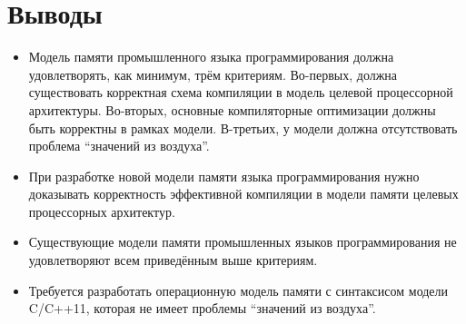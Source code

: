 
\section{Выводы}
\begin{itemize}
  \item Модель памяти промышленного языка программирования должна удовлетворять, как минимум, трём критериям.
    Во-первых, должна существовать корректная схема компиляции в модель целевой процессорной
    архитектуры.
    Во-вторых, основные компиляторные оптимизации должны быть корректны в рамках модели.
    В-третьих, у модели должна отсутствовать проблема ``значений из воздуха''.
  \item При разработке новой модели памяти языка программирования нужно доказывать корректность эффективной компиляции
     в модели памяти целевых процессорных архитектур.
  \item Существующие модели памяти промышленных языков программирования не удовлетворяют всем приведённым выше
    критериям.
  \item Требуется разработать операционную модель памяти с синтаксисом модели C/C++11, которая
    не имеет проблемы ``значений из воздуха''.
\end{itemize}
